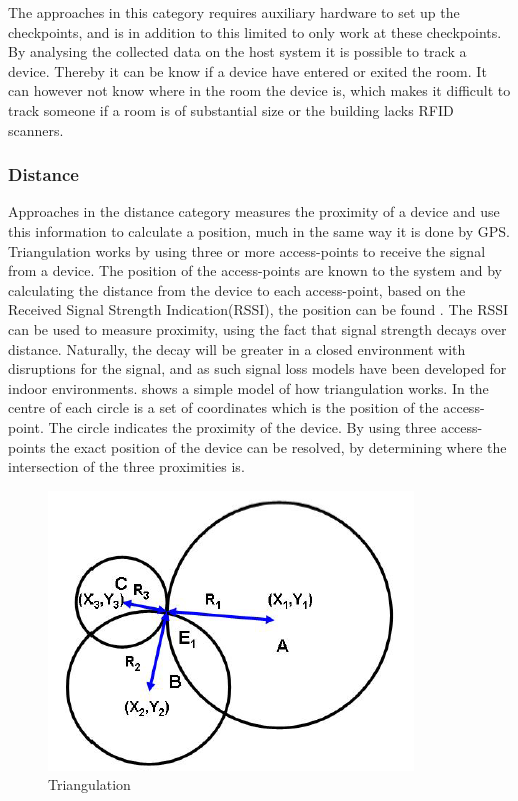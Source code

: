 The approaches in this category requires auxiliary hardware to set up the checkpoints, and is in addition to this limited to only work at these checkpoints. By analysing the collected data on the host system it is possible to track a device. Thereby it can be know if a device have entered or exited the room. It can however not know where in the room the device is, which makes it difficult to track someone if a room is of substantial size or the building lacks RFID scanners\cite{RFIDjournal}.

\subsubsection*{Distance}
Approaches in the distance category measures the proximity of a device and use this information to calculate a position, much in the same way it is done by GPS.
Triangulation works by using three or more access-points to receive the signal from a device. The position of the access-points are known to the system and by calculating the distance from the device to each access-point, based on the Received Signal Strength Indication(RSSI), the position can be found \cite{Triangulation}. The RSSI can be used to measure proximity, using the fact that signal strength decays over distance. Naturally, the decay will be greater in a closed environment with disruptions for the signal, and as such signal loss models have been developed for indoor environments. 
 shows a simple model of how triangulation works. In the centre of each circle is a set of coordinates which is the position of the access-point. The circle indicates the proximity of the device. By using three access-points the exact position of the device can be resolved, by determining where the intersection of the three proximities is.
\begin{figure}[ht]
	\begin{center}
		\includegraphics[scale=1]{graphics/triangulation.png}
		\caption{Triangulation\cite{Triangulation}}
		\label{fig:triangulation}
	\end{center}
\end{figure}

